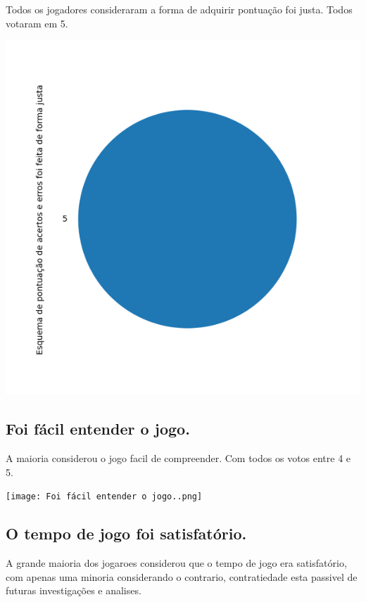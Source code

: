 \documentclass[12pt]{article}
\begin{document}
Todos os jogadores consideraram a forma de adquirir pontuação foi justa. Todos votaram em 5.

\begin{center}
  \includegraphics[scale=0.4]{Esquema de pontuação de acertos e erros foi feita de forma justa.png}
\end{center}

\subsection{Foi fácil entender o jogo.}

A maioria considerou o jogo facil de compreender. Com todos os votos entre 4 e 5.

\begin{center}
  \texttt{[image: Foi fácil entender o jogo..png]}
\end{center}

\subsection{O tempo de jogo foi satisfatório.}

A grande maioria dos jogaroes considerou que o tempo de jogo era satisfatório, com apenas uma minoria considerando o contrario, contratiedade esta passivel de futuras investigações e analises.
\end{document}
